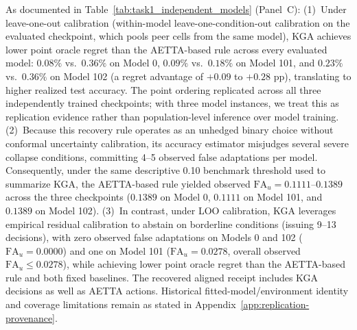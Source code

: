 As documented in Table~\ref{tab:task1_independent_models} (Panel~C):
(1)~Under leave-one-out calibration (within-model leave-one-condition-out calibration on the evaluated checkpoint, which pools peer cells from the same model), KGA achieves lower point oracle regret than the AETTA-based rule across every evaluated model: $0.08\%$ vs.\ $0.36\%$ on Model 0, $0.09\%$ vs.\ $0.18\%$ on Model 101, and $0.23\%$ vs.\ $0.36\%$ on Model 102 (a regret advantage of $+0.09$ to $+0.28\text{ pp}$), translating to higher realized test accuracy. The point ordering replicated across all three independently trained checkpoints; with three model instances, we treat this as replication evidence rather than population-level inference over model training.
(2)~Because this recovery rule operates as an unhedged binary choice without conformal uncertainty calibration, its accuracy estimator misjudges several severe collapse conditions, committing 4--5 observed false adaptations per model. Consequently, under the same descriptive 0.10 benchmark threshold used to summarize KGA, the AETTA-based rule yielded observed $\mathrm{FA}_u = 0.1111$--$0.1389$ across the three checkpoints ($0.1389$ on Model 0, $0.1111$ on Model 101, and $0.1389$ on Model 102).
(3)~In contrast, under LOO calibration, KGA leverages empirical residual calibration to abstain on borderline conditions (issuing 9--13 \abstain decisions), with zero observed false adaptations on Models 0 and 102 ($\mathrm{FA}_u = 0.0000$) and one on Model 101 ($\mathrm{FA}_u = 0.0278$, overall observed $\mathrm{FA}_u \le 0.0278$), while achieving lower point oracle regret than the AETTA-based rule and both fixed baselines. The recovered aligned receipt includes KGA decisions as well as AETTA actions. Historical fitted-model/environment identity and coverage limitations remain as stated in Appendix~\ref{app:replication-provenance}.

